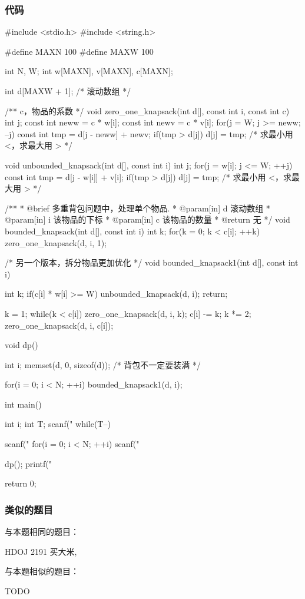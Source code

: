 \subsubsection{代码}
\begin{Codex}[label=bkp.c]
#include <stdio.h>
#include <string.h>

#define MAXN 100
#define MAXW 100

int N, W;
int w[MAXN], v[MAXN], c[MAXN];

int d[MAXW + 1]; /* 滚动数组 */

/** c，物品的系数 */
void zero_one_knapsack(int d[], const int i, const int c) {
    int j;
    const int neww = c * w[i];
    const int newv = c * v[i];
    for(j = W; j >= neww; --j) {
        const int tmp = d[j - neww] + newv;
        if(tmp > d[j]) d[j] = tmp;  /* 求最小用 <，求最大用 > */
    }
}

void unbounded_knapsack(int d[], const int i) {
    int j;
    for(j = w[i]; j <= W; ++j) {
        const int tmp = d[j - w[i]] + v[i];
        if(tmp > d[j]) d[j] = tmp; /* 求最小用 <，求最大用 > */
    }
}

/**
 * @brief 多重背包问题中，处理单个物品.
 * @param[in] d 滚动数组
 * @param[in] i 该物品的下标
 * @param[in] c 该物品的数量
 * @return 无
 */
void bounded_knapsack(int d[], const int i) {
    int k;
    for(k = 0; k < c[i]; ++k) {
        zero_one_knapsack(d, i, 1);
    }
}

/* 另一个版本，拆分物品更加优化 */
void bounded_knapsack1(int d[], const int i) {
    int k;
    if(c[i] * w[i] >= W) {
        unbounded_knapsack(d, i);
        return;
    }

    k = 1;
    while(k < c[i]) {
        zero_one_knapsack(d, i, k);
        c[i] -= k;
        k *= 2;
    }
    zero_one_knapsack(d, i, c[i]);
}

void dp() {
    int i;
    memset(d, 0, sizeof(d)); /* 背包不一定要装满 */

    for(i = 0; i < N; ++i) bounded_knapsack1(d, i);
}
 
int main() {
    int i;
    int T;
    scanf("%
    while(T--) {
        scanf("%
        for(i = 0; i < N; ++i) scanf("%

        dp();
        printf("%
    }
    return 0;
}
\end{Codex}

\subsubsection{类似的题目}
与本题相同的题目：
\begindot
\item HDOJ 2191 买大米, 
\myenddot

与本题相似的题目：
\begindot
\item TODO
\myenddot

